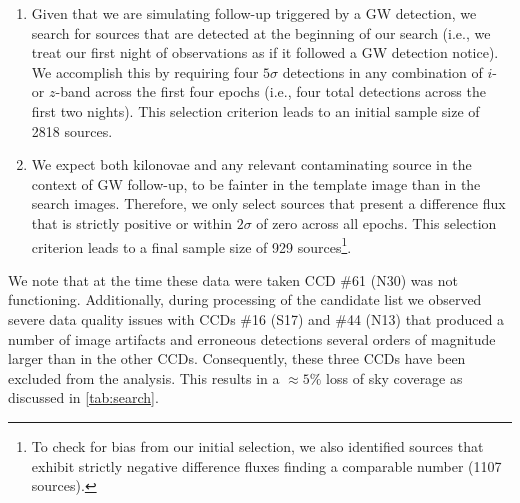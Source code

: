 \begin{enumerate}
\item Given that we are simulating follow-up triggered by a GW detection, we search for sources that are detected at the beginning of our search (i.e., we treat our first night of observations as if it followed a GW detection notice). We accomplish this by requiring four $5\sigma$ detections in any combination of $i$- or $z$-band across the first four epochs (i.e., four total detections across the first two nights).  This selection criterion leads to an initial sample size of 2818 sources.

\item We expect both kilonovae and any relevant contaminating source in the context of GW follow-up, to be fainter in the template image than in the search images. Therefore, we only select sources that present a difference flux that is strictly positive or within $2\sigma$ of zero across all epochs. This selection criterion leads to a final sample size of 929 sources\footnote{To check for bias from our initial selection, we also identified sources that exhibit strictly negative difference fluxes finding a comparable number (1107 sources).}.
\end{enumerate}

We note that at the time these data were taken CCD \#61 (N30) was not functioning. Additionally, during processing of the candidate list we observed severe data quality issues with CCDs \#16 (S17) and \#44 (N13) that produced a number of image artifacts and erroneous detections several orders of magnitude larger than in the other CCDs. Consequently, these three CCDs have been excluded from the analysis. This results in a $\approx 5\%$ loss of sky coverage as discussed in \autoref{tab:search}.

